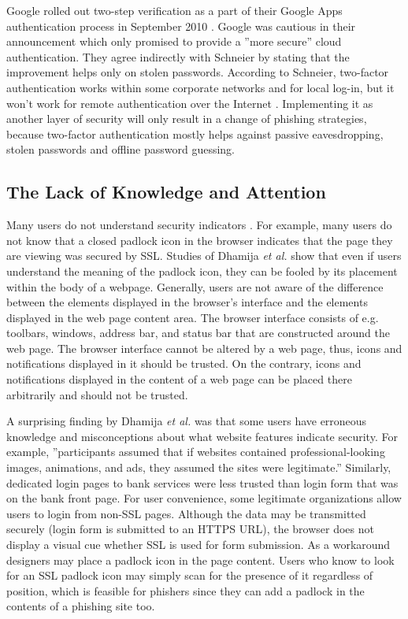 \documentclass[english,gradu]{tktltiki}
\begin{document}
             Google rolled out two-step verification as a part of their Google Apps authentication process in September 2010 \cite{google_2step_2010}. Google was cautious in their announcement which only promised to provide a ''more secure'' cloud authentication. They agree indirectly with Schneier \cite{schneier_2factor_2005} by stating that the improvement helps only on stolen passwords. According to Schneier, two-factor authentication works within some corporate networks and for local log-in, but it won't work for remote authentication over the Internet \cite{schneier_2factor_2005}. Implementing it as another layer of security will only result in a change of phishing strategies, because two-factor authentication mostly helps against passive eavesdropping, stolen passwords and offline password guessing.



\subsection{The Lack of Knowledge and Attention} %
\label{sub:the_lack_of_knowledge_and_attention}

              Many users do not understand security indicators \cite{why_phishing_works_06}. For example, many users do not know that a closed padlock icon in the browser indicates that the page they are viewing was secured by SSL. Studies of Dhamija \emph{et al.} \cite{why_phishing_works_06} show that even if users understand the meaning of the padlock icon, they can be fooled by its placement within the body of a webpage. Generally, users are not aware of the difference between the elements displayed in the browser's interface and the elements displayed in the web page content area. The browser interface consists of e.g. toolbars, windows, address bar, and status bar that are constructed around the web page. The browser interface cannot be altered by a web page, thus, icons and notifications displayed in it should be trusted. On the contrary, icons and notifications displayed in the content of a web page can be placed there arbitrarily and should not be trusted.

                  A surprising finding by Dhamija \emph{et al.} \cite{why_phishing_works_06} was that some users have erroneous knowledge and misconceptions about what website features indicate security. For example, ''participants assumed that if websites contained professional-looking images, animations, and ads, they assumed the sites were legitimate.'' Similarly, dedicated login pages to bank services were less trusted than login form that was on the bank front page. For user convenience, some legitimate organizations allow users to login from non-SSL pages. Although the data may be transmitted securely (login form is submitted to an HTTPS URL), the browser does not display a visual cue whether SSL is used for form submission. As a workaround designers may place a padlock icon in the page content. Users who know to look for an SSL padlock icon may simply scan for the presence of it regardless of position, which is feasible for phishers since they can add a padlock in the contents of a phishing site too.
\end{document}
